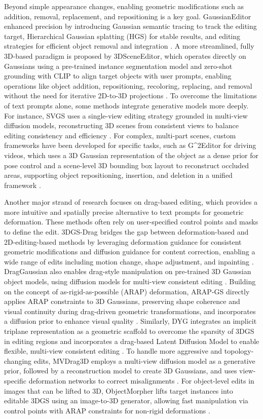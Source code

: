 \documentclass[11pt]{article}
\begin{document}
Beyond simple appearance changes, enabling geometric modifications such as addition, removal, replacement, and repositioning is a key goal. GaussianEditor enhanced precision by introducing Gaussian semantic tracing to track the editing target, Hierarchical Gaussian splatting (HGS) for stable results, and editing strategies for efficient object removal and integration \cite{ref542}. A more streamlined, fully 3D-based paradigm is proposed by 3DSceneEditor, which operates directly on Gaussians using a pre-trained instance segmentation model and zero-shot grounding with CLIP to align target objects with user prompts, enabling operations like object addition, repositioning, recoloring, replacing, and removal without the need for iterative 2D-to-3D projections \cite{ref543}. To overcome the limitations of text prompts alone, some methods integrate generative models more deeply. For instance, SVGS uses a single-view editing strategy grounded in multi-view diffusion models, reconstructing 3D scenes from consistent views to balance editing consistency and efficiency \cite{ref544}. For complex, multi-part scenes, custom frameworks have been developed for specific tasks, such as G\^{}2Editor for driving videos, which uses a 3D Gaussian representation of the object as a dense prior for pose control and a scene-level 3D bounding box layout to reconstruct occluded areas, supporting object repositioning, insertion, and deletion in a unified framework \cite{ref545}.

Another major strand of research focuses on drag-based editing, which provides a more intuitive and spatially precise alternative to text prompts for geometric deformation. These methods often rely on user-specified control points and masks to define the edit. 3DGS-Drag bridges the gap between deformation-based and 2D-editing-based methods by leveraging deformation guidance for consistent geometric modifications and diffusion guidance for content correction, enabling a wide range of edits including motion change, shape adjustment, and inpainting \cite{ref546}. DragGaussian also enables drag-style manipulation on pre-trained 3D Gaussian object models, using diffusion models for multi-view consistent editing \cite{ref547}. Building on the concept of as-rigid-as-possible (ARAP) deformation, ARAP-GS directly applies ARAP constraints to 3D Gaussians, preserving shape coherence and visual continuity during drag-driven geometric transformations, and incorporates a diffusion prior to enhance visual quality \cite{ref548}. Similarly, DYG integrates an implicit triplane representation as a geometric scaffold to overcome the sparsity of 3DGS in editing regions and incorporates a drag-based Latent Diffusion Model to enable flexible, multi-view consistent editing \cite{ref549}. To handle more aggressive and topology-changing edits, MVDrag3D employs a multi-view diffusion model as a generative prior, followed by a reconstruction model to create 3D Gaussians, and uses view-specific deformation networks to correct misalignments \cite{ref550}. For object-level edits in images that can be lifted to 3D, ObjectMorpher lifts target instances into editable 3DGS using an image-to-3D generator, allowing fast manipulation via control points with ARAP constraints for non-rigid deformations \cite{ref551}.
\end{document}
